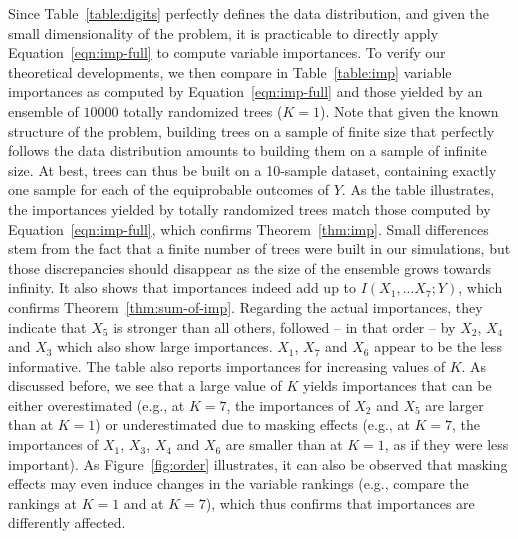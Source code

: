Since Table~\ref{table:digits} perfectly defines the data distribution, and
given the small dimensionality of the problem, it is practicable to directly
apply Equation~\ref{eqn:imp-full} to compute variable importances. To verify our
theoretical developments, we then compare in Table~\ref{table:imp} variable
importances as computed by Equation~\ref{eqn:imp-full} and those yielded by an
ensemble of $10000$ totally randomized trees ($K=1$). Note that given the  known
structure of the problem, building trees on a sample of finite size  that
perfectly follows the data distribution amounts to building them on a sample of
infinite size. At best, trees can thus be built on a 10-sample dataset,
containing exactly one sample for each of the equiprobable outcomes of $Y$. As
the table illustrates, the importances yielded by totally randomized trees match
those computed by Equation~\ref{eqn:imp-full}, which confirms
Theorem~\ref{thm:imp}. Small differences stem from the fact that a finite number
of  trees were built in our simulations, but those discrepancies should
disappear as the size of the ensemble grows towards infinity. It also shows that
importances indeed add up to $I(X_1, ... X_7;Y)$, which confirms
Theorem~\ref{thm:sum-of-imp}.
Regarding the actual importances, they indicate that $X_5$ is stronger than all
others, followed -- in that order -- by $X_2$, $X_4$ and $X_3$ which also show
large importances. $X_1$, $X_7$ and $X_6$ appear to be the less informative. The
table also reports importances for increasing values of $K$. As discussed before,
we see that a large value of $K$ yields importances that can be either
overestimated (e.g., at $K=7$, the importances of $X_2$ and $X_5$ are larger
than at $K=1$) or underestimated due to masking effects (e.g., at $K=7$, the
importances of $X_1$, $X_3$, $X_4$ and $X_6$ are smaller than at $K=1$, as if
they were less important). As Figure~\ref{fig:order} illustrates, it can also be observed that masking effects may even
induce changes in the variable rankings (e.g., compare the rankings at $K=1$ and
at $K=7$), which thus confirms that importances are differently affected.

